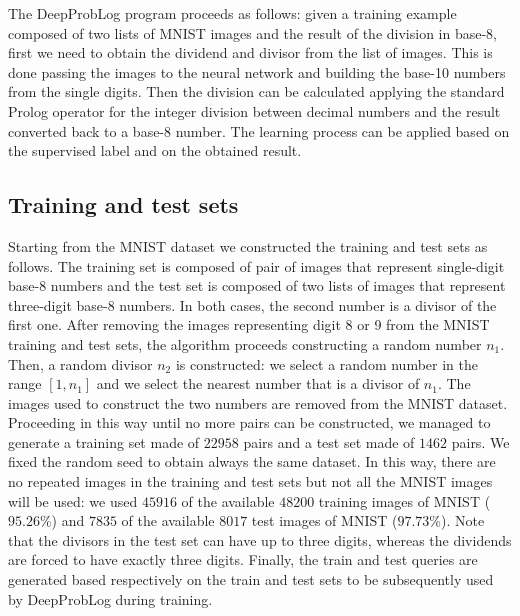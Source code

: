 
The DeepProbLog program proceeds as follows: given a training example composed of two lists of MNIST images and the result of the division in base-8, first we need to obtain the dividend and divisor from the list of images. This is done passing the images to the neural network and building the base-10 numbers from the single digits. Then the division can be calculated applying the standard Prolog operator for the integer division between decimal numbers and the result converted back to a base-8 number. The learning process can be applied based on the supervised label and on the obtained result.





\subsection{Training and test sets}
Starting from the MNIST dataset we constructed the training and test sets as follows. The training set is composed of pair of images that represent single-digit base-8 numbers and the test set is composed of two lists of images that represent three-digit base-8 numbers. In both cases, the second number is a divisor of the first one. %
After removing the images representing digit 8 or 9 from the MNIST training and test sets, the algorithm proceeds constructing a random number $n_1$. Then, a random divisor $n_2$ is constructed: we select a random number in the range $[1,n_1]$ and we select the nearest number that is a divisor of $n_1$. The images used to construct the two numbers are removed from the MNIST dataset. Proceeding in this way until no more pairs can be constructed, we managed to generate a training set made of $22958$ pairs and a test set made of $1462$ pairs. We fixed the random seed to obtain always the same dataset. In this way, there are no repeated images in the training and test sets but not all the MNIST images will be used: we used $45916$ of the available $48200$ training images of MNIST ($95.26\%$) and $7835$ of the available $8017$ test images of MNIST ($97.73\%$). Note that the divisors in the test set can have up to three digits, whereas the dividends are forced to have exactly three digits.
Finally, the train and test queries are generated based respectively on the train and test sets to be subsequently used by DeepProbLog during training.

